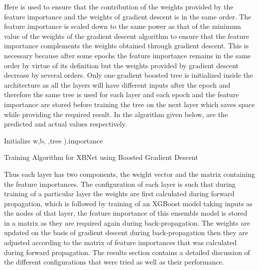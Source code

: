 \documentclass[review]{elsarticle}
\begin{document}
Here  is used to ensure that the contribution of the weights provided by the feature importance and the weights of gradient descent is in the same order. The feature importance is scaled down to the same power as that of the minimum value of the weights of the gradient descent algorithm to ensure that the feature importance complements the weights obtained through gradient descent. This is necessary because after some epochs the feature importance remains in the same order by virtue of its definition but the weights provided by gradient descent decrease by several orders. Only one gradient boosted tree is initialized inside the architecture as all the layers will have different inputs after the epoch and therefore the same tree is used for each layer and each epoch and the feature importance are stored before training the tree on the next layer which saves space while providing the required result. In the algorithm given below,  are the predicted and actual values respectively.
\begin{algorithm}[hbt!]
\SetAlgoLined
{}
 Initialize w,b, ,tree\;
 ).importance\;
 
 \caption{Training Algorithm for XBNet using Boosted Gradient Descent}
\end{algorithm}

Thus each layer has two components, the weight vector and the matrix containing the feature importances. The configuration of each layer is such that during training of a particular layer the weights are first calculated during forward propagation, which is followed by training of an XGBoost model taking inputs as the nodes of that layer, the feature importance of this ensemble model is stored in a matrix as they are required again during back-propagation. The weights are updated on the basis of gradient descent during back-propagation then they are adjusted according to the matrix of feature importances that was calculated during forward propagation. The results section contains a detailed discussion of the different configurations that were tried as well as their performance. 
\end{document}
